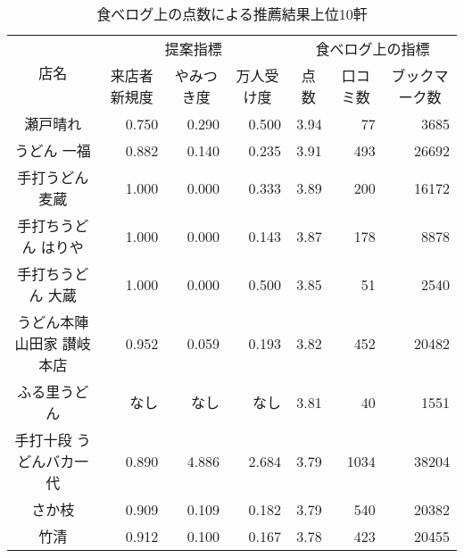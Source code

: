 \begin{table}[H]
\centering
\caption{食べログ上の点数による推薦結果上位10軒}
\label{table:scrutiny:rank}
\small
\begin{tabular}{|c|r|r|r|r|r|r|}
\hline
\multirow{2}{*}{店名} & \multicolumn{3}{c|}{提案指標} & \multicolumn{3}{c|}{食べログ上の指標} \\ \cline{2-7}
 & \multicolumn{1}{c|}{来店者新規度} & \multicolumn{1}{c|}{やみつき度} & \multicolumn{1}{c|}{万人受け度} & \multicolumn{1}{c|}{点数} & \multicolumn{1}{c|}{口コミ数} & \multicolumn{1}{c|}{ブックマーク数} \\ \hline
瀬戸晴れ & 0.750 & 0.290 & 0.500 & 3.94 & 77 & 3685 \\ \hline
うどん 一福 & 0.882 & 0.140 & 0.235 & 3.91 & 493 & 26692 \\ \hline
手打うどん 麦蔵 & 1.000 & 0.000 & 0.333 & 3.89 & 200 & 16172 \\ \hline
手打ちうどん はりや & 1.000 & 0.000 & 0.143 & 3.87 & 178 & 8878 \\ \hline
手打ちうどん 大蔵 & 1.000 & 0.000 & 0.500 & 3.85 & 51 & 2540 \\ \hline
うどん本陣 山田家 讃岐本店 & 0.952 & 0.059 & 0.193 & 3.82 & 452 & 20482 \\ \hline
ふる里うどん & なし & なし & なし & 3.81 & 40 & 1551 \\ \hline
手打十段 うどんバカ一代 & 0.890 & 4.886 & 2.684 & 3.79 & 1034 & 38204 \\ \hline
さか枝 & 0.909 & 0.109 & 0.182 & 3.79 & 540 & 20382 \\ \hline
竹清 & 0.912 & 0.100 & 0.167 & 3.78 & 423 & 20455 \\ \hline
\end{tabular}
\end{table}
